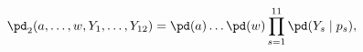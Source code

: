\begin{equation}
  \pd_{2} (a, \ldots, w, Y_{1}, \ldots, Y_{12}) = 
    \pd(a) \ldots \pd(w)
    \prod_{s = 1}^{11} \pd(Y_{s} \mid p_{s}),
  \label{eqn:big-submodel}
\end{equation}